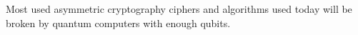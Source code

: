  Most used asymmetric cryptography ciphers and algorithms used today will be broken by quantum computers with enough qubits.